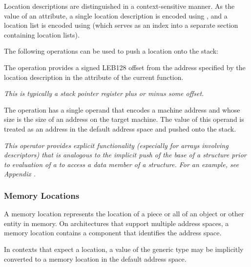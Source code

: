 Location descriptions are distinguished in a context-sensitive
manner. As the value of an attribute, a single location description is
encoded using \CLASSlocdesc, and a location list is encoded using
\CLASSloclist (which serves as an index into a separate section
containing location lists).

The following operations can be used to push a location onto the
stack:

\begin{enumerate}[1. ]
\itembfnl{\DWOPfbregTARG} The \DWOPfbregNAME{} operation provides a
signed LEB128 offset from the address
specified by the location description in the \DWATframebase{}
attribute of the current function.

\textit{This is typically a stack pointer register plus or minus some
offset.}
  
\itembfnl{\DWOPpushobjectaddressTARG}
The \DWOPpushobjectaddressNAME{} operation has a single operand that
encodes a machine address and whose size is the size of an address on
the target machine. The value of this operand is treated as an address
in the default address space and pushed onto the stack.

\textit{This operator provides explicit functionality
(especially for arrays involving descriptors) that is analogous
to the implicit push of the base
of a structure prior to evaluation of a
\DWATdatamemberlocation{}
to access a data member of a structure. For an example, see
Appendix .}


\end{enumerate}

\subsubsection{Memory Locations}
\label{chap:memorylocations}

A  memory location
 represents the location of a piece or
all of an object or other entity in memory. On architectures that
support multiple address spaces, a memory location contains a
component that identifies the address space.

In contexts that expect a location, a value of the generic type may be
implicitly converted to a memory location in the default address
space.

